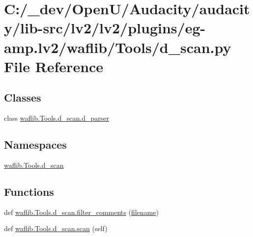 \hypertarget{lv2_2plugins_2eg-amp_8lv2_2waflib_2_tools_2d__scan_8py}{}\section{C\+:/\+\_\+dev/\+Open\+U/\+Audacity/audacity/lib-\/src/lv2/lv2/plugins/eg-\/amp.lv2/waflib/\+Tools/d\+\_\+scan.py File Reference}
\label{lv2_2plugins_2eg-amp_8lv2_2waflib_2_tools_2d__scan_8py}
\subsection*{Classes}
\begin{DoxyCompactItemize}
\item 
class \hyperlink{classwaflib_1_1_tools_1_1d__scan_1_1d__parser}{waflib.\+Tools.\+d\+\_\+scan.\+d\+\_\+parser}
\end{DoxyCompactItemize}
\subsection*{Namespaces}
\begin{DoxyCompactItemize}
\item 
 \hyperlink{namespacewaflib_1_1_tools_1_1d__scan}{waflib.\+Tools.\+d\+\_\+scan}
\end{DoxyCompactItemize}
\subsection*{Functions}
\begin{DoxyCompactItemize}
\item 
def \hyperlink{namespacewaflib_1_1_tools_1_1d__scan_a69a1f7647c38122c357199fd7b4444d3}{waflib.\+Tools.\+d\+\_\+scan.\+filter\+\_\+comments} (\hyperlink{test__portburn_8cpp_a7efa5e9c7494c7d4586359300221aa5d}{filename})
\item 
def \hyperlink{namespacewaflib_1_1_tools_1_1d__scan_ac5685815562961157b97476a3a3658ca}{waflib.\+Tools.\+d\+\_\+scan.\+scan} (self)
\end{DoxyCompactItemize}
